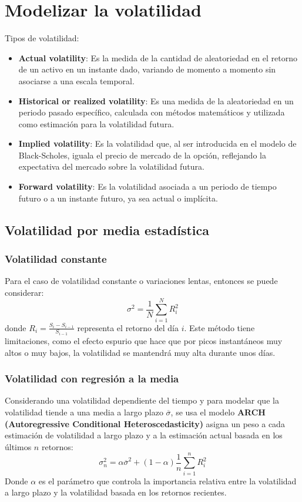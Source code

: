 \section{Modelizar la volatilidad}
Tipos de volatilidad:
\begin{itemize}
    \item \textbf{Actual volatility}: Es la medida de la cantidad de aleatoriedad en el retorno de un activo en un instante dado, variando de momento a momento sin asociarse a una escala temporal.
    \item \textbf{Historical or realized volatility}: Es una medida de la aleatoriedad en un periodo pasado específico, calculada con métodos matemáticos y utilizada como estimación para la volatilidad futura.
    \item \textbf{Implied volatility}: Es la volatilidad que, al ser introducida en el modelo de Black-Scholes, iguala el precio de mercado de la opción, reflejando la expectativa del mercado sobre la volatilidad futura.
    \item \textbf{Forward volatility}: Es la volatilidad asociada a un periodo de tiempo futuro o a un instante futuro, ya sea actual o implícita.
\end{itemize}



\subsection{Volatilidad por media estadística}

\subsubsection{Volatilidad constante}
Para el caso de volatilidad constante o variaciones lentas, entonces se puede considerar:
\[
\sigma^2 = \frac{1}{N} \sum_{i=1}^{N} R_i^2
\]
donde $ R_i = \frac{S_i - S_{i-1}}{S_{i-1}} $ representa el retorno del día $i$. Este método tiene limitaciones, como el efecto espurio que hace que por picos instantáneos muy altos o muy bajos, la volatilidad se mantendrá muy alta durante unos días.


\subsubsection{Volatilidad con regresión a la media}
Considerando una volatilidad dependiente del tiempo y para modelar que la volatilidad tiende a una media a largo plazo $\overline{\sigma}$, se usa el modelo \textbf{ARCH (Autoregressive Conditional Heteroscedasticity)} asigna un peso a cada estimación de volatilidad a largo plazo y a la estimación actual basada en los últimos $n$ retornos:
\[
\sigma_n^2 = \alpha \overline{\sigma}^2 + (1 - \alpha) \frac{1}{n} \sum_{i=1}^{n} R_i^2
\]
Donde $\alpha$ es el parámetro que controla la importancia relativa entre la volatilidad a largo plazo y la volatilidad basada en los retornos recientes.




